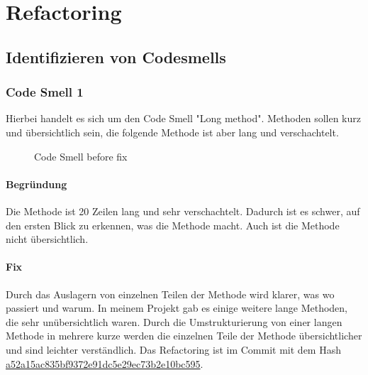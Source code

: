 
\chapter{Refactoring}
\label{refactoring}

\section{Identifizieren von Codesmells}

    \subsection{Code Smell 1}
    Hierbei handelt es sich um den Code Smell "Long method". Methoden sollen kurz und übersichtlich sein, die folgende Methode ist aber lang und verschachtelt.
    
    \begin{figure}[h]
	    \centering
	    \caption{Code Smell  before fix}
    \end{figure}
    
    
        \subsubsection{Begründung}
        Die Methode ist 20 Zeilen lang und sehr verschachtelt. Dadurch ist es schwer, auf den ersten Blick zu erkennen, was die Methode macht. Auch ist die Methode nicht übersichtlich.

        \subsubsection{Fix}
        Durch das Auslagern von einzelnen Teilen der Methode wird klarer, was wo passiert und warum. In meinem Projekt gab es einige weitere lange Methoden, die sehr unübersichtlich waren. Durch die Umstrukturierung von einer langen Methode in mehrere kurze werden die einzelnen Teile der Methode übersichtlicher und sind leichter verständlich. Das Refactoring ist im Commit mit dem Hash \href{https://github.com/Krissi005/seriephant/commit/a52a15ac835bf9372e91dc5e29ec73b2e10bc595}{a52a15ac835bf9372e91dc5e29ec73b2e10bc595}.
    

